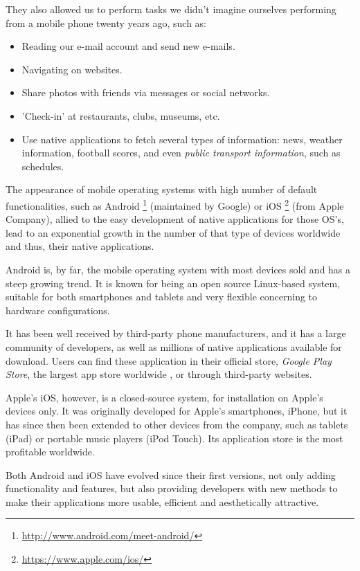 They also allowed us to perform tasks we didn't imagine ourselves performing from a mobile phone twenty years ago, such as:

\begin{itemize}
\item Reading our e-mail account and send new e-mails.
\item Navigating on websites.
\item Share photos with friends via messages or social networks.
\item 'Check-in' at restaurants, clubs, museums, etc.
\item Use native applications to fetch several types of information: news, weather information, football scores, and even \emph{public transport information}, such as schedules.
\end{itemize}

The appearance of mobile operating systems with high number of default functionalities, such as Android \footnote{\url{http://www.android.com/meet-android/}} (maintained by Google) or iOS \footnote{\url{https://www.apple.com/ios/}} (from Apple Company), allied to the easy development of native applications for those OS's, lead to an exponential growth in the number of that type of devices worldwide and thus, their native applications.

Android is, by far, the mobile operating system with most devices sold and has a steep growing trend. It is known for being an open source Linux-based system, suitable for both smartphones and tablets and very flexible concerning to hardware configurations.

It has been well received by third-party phone manufacturers, and it has a large community of developers, as well as millions of native applications available for download. Users can find these application in their official store, \emph{Google Play Store}, the largest app store worldwide \cite{kn:Are13}, or through third-party websites.

Apple's iOS, however, is a closed-source system, for installation on Apple's devices only. 
It was originally developed for Apple's smartphones, iPhone, but it has since then been extended to other devices from the company, such as tablets (iPad) or portable music players (iPod Touch). Its application store is the most profitable worldwide.

Both Android and iOS have evolved since their first versions, not only adding functionality and features, but also providing developers with new methods to make their applications more usable, efficient and aesthetically attractive.

